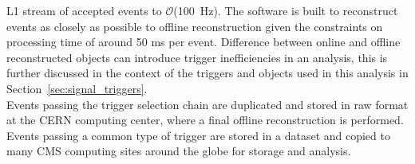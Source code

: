 L1 stream of accepted events to $\mathcal{O}$(100~Hz). The software is built to reconstruct
events as closely as possible to offline reconstruction given the constraints on processing time
of around 50 ms per event. Difference between online and offline reconstructed objects can 
introduce trigger inefficiencies in an analysis, this is further discussed in the 
context of the triggers and objects used in this analysis in Section~\ref{sec:signal_triggers}.\\
\indent Events passing the trigger selection chain are duplicated and stored in raw format at
the CERN computing center, where a final offline reconstruction is performed. Events passing
a common type of trigger are stored in a dataset and copied to many CMS computing sites around the
globe for storage and analysis. 
  
%
